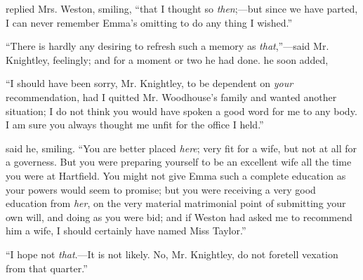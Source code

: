  replied Mrs. Weston, smiling, “that I thought so {\em then};---but since we have parted, I can never remember Emma's omitting to do any thing I wished.”

“There is hardly any desiring to refresh such a memory as {\em that},”---said Mr. Knightley, feelingly; and for a moment or two he had done.  he soon added, 

“I should have been sorry, Mr. Knightley, to be dependent on {\em your} recommendation, had I quitted Mr. Woodhouse's family and wanted another situation; I do not think you would have spoken a good word for me to any body. I am sure you always thought me unfit for the office I held.”

 said he, smiling. “You are better placed {\em here}; very fit for a wife, but not at all for a governess. But you were preparing yourself to be an excellent wife all the time you were at Hartfield. You might not give Emma such a complete education as your powers would seem to promise; but you were receiving a very good education from {\em her}, on the very material matrimonial point of submitting your own will, and doing as you were bid; and if Weston had asked me to recommend him a wife, I should certainly have named Miss Taylor.”



“I hope not {\em that}.---It is not likely. No, Mr. Knightley, do not foretell vexation from that quarter.”

